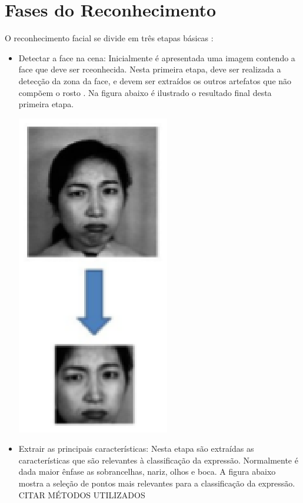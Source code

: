 \section{Fases do Reconhecimento}
O reconhecimento facial se divide em três etapas básicas \cite{Elizabeth}:
\begin{itemize}
\item Detectar a face na cena: Inicialmente é apresentada uma imagem contendo a face que deve ser rceonhecida. Nesta primeira etapa, deve ser realizada a detecção da zona da face, e devem ser extraídos os outros artefatos que não compõem o rosto \cite{FernandoGil}.
Na figura abaixo é ilustrado o resultado final desta primeira etapa.
\begin{center} 
	\includegraphics[scale=0.5]{graficos/rosto}
	\cite{Elizabeth}
\end{center}
\item Extrair as principais características: Nesta etapa são extraídas as características que são relevantes à classificação da expressão. Normalmente é dada maior ênfase as sobrancelhas, nariz, olhos e boca.
A figura abaixo mostra a seleção de pontos mais relevantes para a classificação da expressão. CITAR MÉTODOS UTILIZADOS
\begin{center}

\end{center}
\end{itemize}
